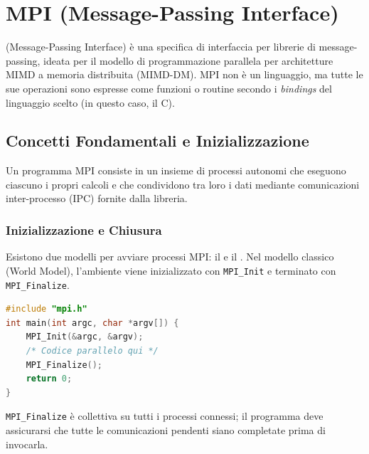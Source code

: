 \chapter{MPI (Message-Passing Interface)} 

 (Message-Passing Interface) è una specifica di interfaccia per librerie di message-passing, ideata per il modello di programmazione parallela per architetture MIMD a memoria distribuita (MIMD-DM).
MPI non è un linguaggio, ma tutte le sue operazioni sono espresse come funzioni o routine secondo i \textit{bindings} del linguaggio scelto (in questo caso, il C).

\section{Concetti Fondamentali e Inizializzazione}
Un programma MPI consiste in un insieme di processi autonomi che eseguono ciascuno i propri calcoli e che condividono tra loro i dati mediante comunicazioni inter-processo (IPC) fornite dalla libreria.

\subsection{Inizializzazione e Chiusura}
Esistono due modelli per avviare processi MPI: il  e il . Nel modello classico (World Model), l'ambiente viene inizializzato con \texttt{MPI\_Init} e terminato con \texttt{MPI\_Finalize}.
\begin{lstlisting}[language=C, numbers=none]
#include "mpi.h"
int main(int argc, char *argv[]) {
    MPI_Init(&argc, &argv);
    /* Codice parallelo qui */
    MPI_Finalize();
    return 0;
}
\end{lstlisting}
\begin{note}{}
    \texttt{MPI\_Finalize} è collettiva su tutti i processi connessi; il programma deve assicurarsi che tutte le comunicazioni pendenti siano completate prima di invocarla.
\end{note}

